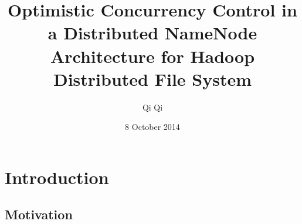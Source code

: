 \documentclass{beamer}
\title[OCC for Hops-HDFS]{Optimistic Concurrency Control in a Distributed NameNode Architecture for Hadoop Distributed File System} %
\author{Qi Qi} %
\institute[IST/KTH/SICS] %
{
Instituto Superior T\'{e}cnico - IST (Portugal) \\ Royal Institute of Technology - KTH (Sweden) \\ 
Swedish Institute of Computer Science - SICS (Sweden) \\%
\medskip
\textit{qiq@kth.se} %
}
\date{8 October 2014} %
\begin{document}
\begin{frame}
\titlepage %
\end{frame}



\section{Introduction} %

\subsection{Motivation} %
\end{document}
